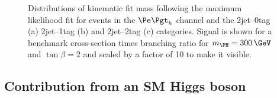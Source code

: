 \begin{figure}
\begin{center}

\end{center}
\caption[Distributions of kinematic fit mass following the maximum likelihood fit for
events in the $\etau$ channel.]{
Distributions of kinematic fit mass following the maximum likelihood fit for
events in the $\etau$ channel and the 2jet--0tag (a) 2jet--1tag (b) 
and 2jet--2tag (c) categories. Signal is shown for a benchmark
cross-section times branching ratio for $m_{\PH}=300\,\GeV$ and $\tan\beta=2$
and scaled by a factor of 10 to make it visible.}
\label{fig:PostFitMHetau}
\end{figure} 

\subsection{Contribution from an SM Higgs boson}

